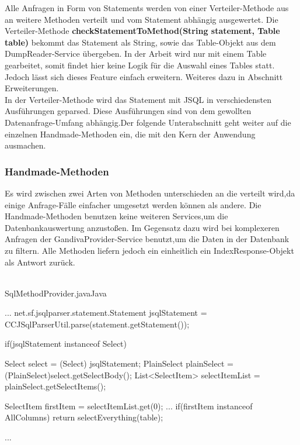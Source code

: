 Alle Anfragen in Form von Statements werden von einer Verteiler-Methode aus an weitere Methoden verteilt und vom Statement abhängig ausgewertet.
Die Verteiler-Methode \textbf{checkStatementToMethod(String statement, Table table)} bekommt das Statement als String, sowie das Table-Objekt aus dem DumpReader-Service übergeben. In der Arbeit wird nur mit einem Table gearbeitet, somit findet hier keine Logik für die Auswahl eines Tables statt. Jedoch lässt sich dieses Feature einfach erweitern. Weiteres dazu in Abschnitt Erweiterungen.\\

In der Verteiler-Methode wird das Statement mit JSQL in verschiedensten Ausführungen geparsed. Diese Ausführungen sind von dem gewollten Datenanfrage-Umfang abhängig.Der folgende Unterabschnitt geht weiter auf die einzelnen Handmade-Methoden ein, die mit den Kern der Anwendung ausmachen.


\subsubsection{Handmade-Methoden}


Es wird zwischen zwei Arten von Methoden unterschieden an die verteilt wird,da einige Anfrage-Fälle einfacher umgesetzt werden können als andere.
Die Handmade-Methoden benutzen keine weiteren Services,um die Datenbankauswertung anzustoßen. Im Gegensatz dazu wird bei komplexeren Anfragen der GandivaProvider-Service benutzt,um die Daten in der Datenbank zu filtern.
Alle Methoden liefern jedoch ein einheitlich ein IndexResponse-Objekt als Antwort zurück.\\\\

\begin{codeblock}{SqlMethodProvider.java}{Java}
  \begin{javacode}
    ...
net.sf.jsqlparser.statement.Statement jsqlStatement = CCJSqlParserUtil.parse(statement.getStatement()); 

if(jsqlStatement instanceof Select) {

            Select select = (Select) jsqlStatement;
            PlainSelect plainSelect = (PlainSelect)select.getSelectBody();
            List<SelectItem> selectItemList = plainSelect.getSelectItems();

            SelectItem firstItem = selectItemList.get(0);
			...
            if(firstItem instanceof AllColumns){
                return selectEverything(table);
            }
}
    ...
  \end{javacode}
\end{codeblock}


